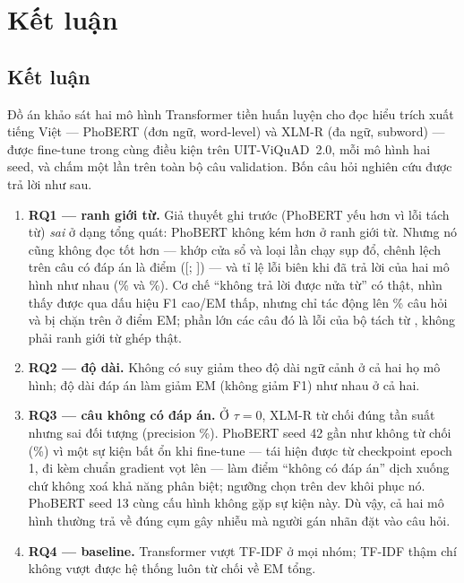 \section{Kết luận}
\label{sec:conclusion}

\subsection{Kết luận}

Đồ án khảo sát hai mô hình Transformer tiền huấn luyện cho đọc hiểu trích xuất tiếng Việt --- PhoBERT
(đơn ngữ, word-level) và XLM-R (đa ngữ, subword) --- được fine-tune trong cùng điều kiện trên
UIT-ViQuAD~2.0, mỗi mô hình hai seed, và chấm một lần trên toàn bộ \NVal{} câu validation. Bốn câu hỏi
nghiên cứu được trả lời như sau.

\begin{enumerate}
  \item \textbf{RQ1 --- ranh giới từ.} Giả thuyết ghi trước (PhoBERT yếu hơn vì lỗi tách từ) \emph{sai}
        ở dạng tổng quát: PhoBERT không kém hơn ở ranh giới từ. Nhưng nó cũng không đọc tốt hơn --- khớp cửa sổ và
        loại lần chạy sụp đổ, chênh lệch trên câu có đáp án là \PairMAnsDiff{} điểm
        ([\PairMAnsArtLo; \PairMAnsArtHi]) --- và tỉ lệ lỗi biên
        khi đã trả lời của hai mô hình như nhau (\PhobertBoundaryRate\% và \XlmrBoundaryRate\%). Cơ chế
        ``không trả lời được nửa từ'' có thật, nhìn thấy được qua dấu hiệu F1 cao/EM thấp, nhưng chỉ tác
        động lên \SegMisPct\% câu hỏi và bị chặn trên ở \SegCeilingLoss{} điểm EM; phần lớn các câu đó là lỗi
        của bộ tách từ , không phải ranh giới từ ghép thật.
  \item \textbf{RQ2 --- độ dài.} Không có suy giảm theo độ dài ngữ cảnh ở cả hai họ mô hình; độ dài đáp án
        làm giảm EM (không giảm F1) như nhau ở cả hai.
  \item \textbf{RQ3 --- câu không có đáp án.} Ở $\tau = 0$, XLM-R từ chối đúng tần suất nhưng sai đối tượng
        (precision \XlmrAbsPrec\%). PhoBERT seed 42 gần như không từ chối (\PhobertAbsRate\%) vì một sự kiện bất
        ổn khi fine-tune --- tái hiện được từ checkpoint epoch 1, đi kèm chuẩn gradient vọt lên --- làm điểm
        ``không có đáp án'' dịch xuống chứ không xoá khả năng phân biệt; ngưỡng chọn trên dev khôi phục nó.
        PhoBERT seed 13 cùng cấu hình không gặp sự kiện này. Dù vậy, cả hai mô hình thường trả về đúng cụm gây
        nhiễu mà người gán nhãn đặt vào câu hỏi.
  \item \textbf{RQ4 --- baseline.} Transformer vượt TF-IDF ở mọi nhóm; TF-IDF thậm chí không vượt được hệ
        thống luôn từ chối về EM tổng.
\end{enumerate}

